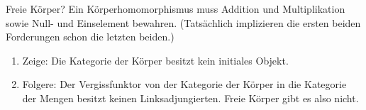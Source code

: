 \documentclass{pizzablatt}
\begin{document}
\begin{aufgabe}{Freie Körper?}
Ein Körperhomomorphismus muss Addition und Multiplikation sowie Null- und
Einselement bewahren. (Tatsächlich implizieren die ersten beiden Forderungen
schon die letzten beiden.)
\begin{enumerate}
\item Zeige: Die Kategorie der Körper besitzt kein initiales Objekt.
\item Folgere: Der Vergissfunktor von der Kategorie der Körper in die Kategorie
der Mengen besitzt keinen Linksadjungierten. Freie Körper gibt es also nicht.
\end{enumerate}
\end{aufgabe}
\end{document}
